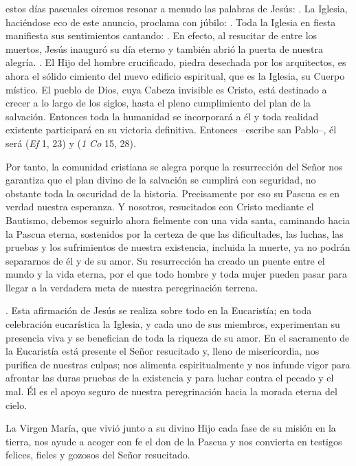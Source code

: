 \begin{body}
 estos días pascuales oiremos resonar a menudo las palabras de Jesús: . La Iglesia, haciéndose eco de este anuncio, proclama con júbilo: . Toda la Iglesia en fiesta manifiesta sus sentimientos cantando: . En efecto, al resucitar de entre los muertos, Jesús inauguró su día eterno y también abrió la puerta de nuestra alegría. . El Hijo del hombre crucificado, piedra desechada por los arquitectos, es ahora el sólido cimiento del nuevo edificio espiritual, que es la Iglesia, su Cuerpo místico. El pueblo de Dios, cuya Cabeza invisible es Cristo, está destinado a crecer a lo largo de los siglos, hasta el pleno cumplimiento del plan de la salvación. Entonces toda la humanidad se incorporará a él y toda realidad existente participará en su victoria definitiva. Entonces –escribe san Pablo–, él será  (\textit{Ef} 1, 23) y  (\textit{1 Co} 15, 28). 

Por tanto, la comunidad cristiana se alegra porque la resurrección del Señor nos garantiza que el plan divino de la salvación se cumplirá con seguridad, no obstante toda la oscuridad de la historia. Precisamente por eso su Pascua es en verdad nuestra esperanza. Y nosotros, resucitados con Cristo mediante el Bautismo, debemos seguirlo ahora fielmente con una vida santa, caminando hacia la Pascua eterna, sostenidos por la certeza de que las dificultades, las luchas, las pruebas y los sufrimientos de nuestra existencia, incluida la muerte, ya no podrán separarnos de él y de su amor. Su resurrección ha creado un puente entre el mundo y la vida eterna, por el que todo hombre y toda mujer pueden pasar para llegar a la verdadera meta de nuestra peregrinación terrena. 

. Esta afirmación de Jesús se realiza sobre todo en la Eucaristía; en toda celebración eucarística la Iglesia, y cada uno de sus miembros, experimentan su presencia viva y se benefician de toda la riqueza de su amor. En el sacramento de la Eucaristía está presente el Señor resucitado y, lleno de misericordia, nos purifica de nuestras culpas; nos alimenta espiritualmente y nos infunde vigor para afrontar las duras pruebas de la existencia y para luchar contra el pecado y el mal. Él es el apoyo seguro de nuestra peregrinación hacia la morada eterna del cielo. 

La Virgen María, que vivió junto a su divino Hijo cada fase de su misión en la tierra, nos ayude a acoger con fe el don de la Pascua y nos convierta en testigos felices, fieles y gozosos del Señor resucitado.
\end{body}


